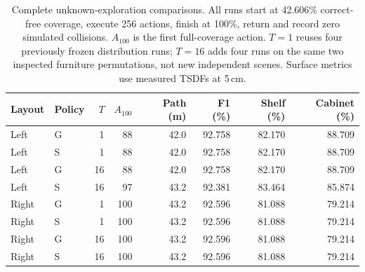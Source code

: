 \begin{table}[!htbp]
\centering\small\setlength{\tabcolsep}{4pt}
\caption{Complete unknown-exploration comparisons. All runs start at 42.606\% correct-free coverage, execute 256 actions, finish at 100\%, return and record zero simulated collisions. $A_{100}$ is the first full-coverage action. $T=1$ reuses four previously frozen distribution runs; $T=16$ adds four runs on the same two inspected furniture permutations, not new independent scenes. Surface metrics use measured TSDFs at 5\,cm.}
\label{tab:temperature-policy}
\begin{tabular}{llrrrrrr}
\toprule
Layout & Policy & $T$ & $A_{100}$ & Path (m) & F1 (\%) & Shelf (\%) & Cabinet (\%) \\
\midrule
Left & G & 1 & 88 & 42.0 & 92.758 & 82.170 & 88.709 \\
Left & S & 1 & 88 & 42.0 & 92.758 & 82.170 & 88.709 \\
Left & G & 16 & 88 & 42.0 & 92.758 & 82.170 & 88.709 \\
Left & S & 16 & 97 & 43.2 & 92.381 & 83.464 & 85.874 \\
\midrule
Right & G & 1 & 100 & 43.2 & 92.596 & 81.088 & 79.214 \\
Right & S & 1 & 100 & 43.2 & 92.596 & 81.088 & 79.214 \\
Right & G & 16 & 100 & 43.2 & 92.596 & 81.088 & 79.214 \\
Right & S & 16 & 100 & 43.2 & 92.596 & 81.088 & 79.214 \\
\bottomrule
\end{tabular}
\end{table}

